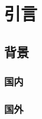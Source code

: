 \documentclass{ecustbachelorthesis}
\begin{document}

\mktableofcontents
% 
% 
% 
% 
\chapter{引言}
\section{背景}
\subsection{国内}
\subsection{国外}

\nocite{*}

\end{document}
